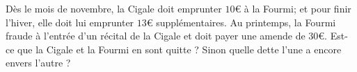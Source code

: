 
\begin{exercice}\label{exo2smath-0086}

    Dès le mois de novembre, la Cigale doit emprunter \( 10\)€ à la Fourmi; et pour finir l'hiver, elle doit lui emprunter \( 13\)€ supplémentaires. Au printemps, la Fourmi fraude à l'entrée d'un récital de la Cigale et doit payer une amende de \( 30\)€. Est-ce que la Cigale et la Fourmi en sont quitte ? Sinon quelle dette l'une a encore envers l'autre ?

\end{exercice}
